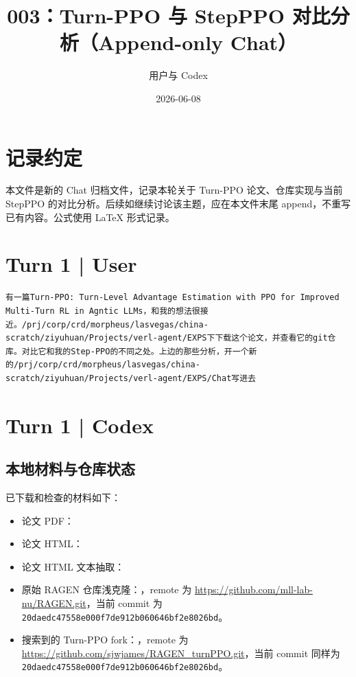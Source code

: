 \documentclass[10pt]{ctexart}
\title{003：Turn-PPO 与 StepPPO 对比分析（Append-only Chat）}
\author{用户与 Codex}
\date{2026-06-08}
\newcommand{\code}[1]{\texttt{#1}}
\begin{document}
\maketitle
\vspace{-1.2em}

\section*{记录约定}
本文件是新的 Chat 归档文件，记录本轮关于 Turn-PPO 论文、仓库实现与当前 StepPPO 的对比分析。后续如继续讨论该主题，应在本文件末尾 append，不重写已有内容。公式使用 LaTeX 形式记录。

\section*{Turn 1 | User}
\begin{Verbatim}[breaklines=true,breakanywhere=true]
有一篇Turn-PPO: Turn-Level Advantage Estimation with PPO for Improved Multi-Turn RL in Agntic LLMs，和我的想法很接近。/prj/corp/crd/morpheus/lasvegas/china-scratch/ziyuhuan/Projects/verl-agent/EXPS下下载这个论文，并查看它的git仓库。对比它和我的Step-PPO的不同之处。上边的那些分析，开一个新的/prj/corp/crd/morpheus/lasvegas/china-scratch/ziyuhuan/Projects/verl-agent/EXPS/Chat写进去
\end{Verbatim}

\section*{Turn 1 | Codex}

\subsection*{本地材料与仓库状态}
已下载和检查的材料如下：
\begin{itemize}
  \item 论文 PDF：
  \item 论文 HTML：
  \item 论文 HTML 文本抽取：
  \item 原始 RAGEN 仓库浅克隆：，remote 为 \url{https://github.com/mll-lab-nu/RAGEN.git}，当前 commit 为 \code{20daedc47558e000f7de912b060646bf2e8026bd}。
  \item 搜索到的 Turn-PPO fork：，remote 为 \url{https://github.com/sjwjames/RAGEN_turnPPO.git}，当前 commit 同样为 \code{20daedc47558e000f7de912b060646bf2e8026bd}。
\end{itemize}
\end{document}
